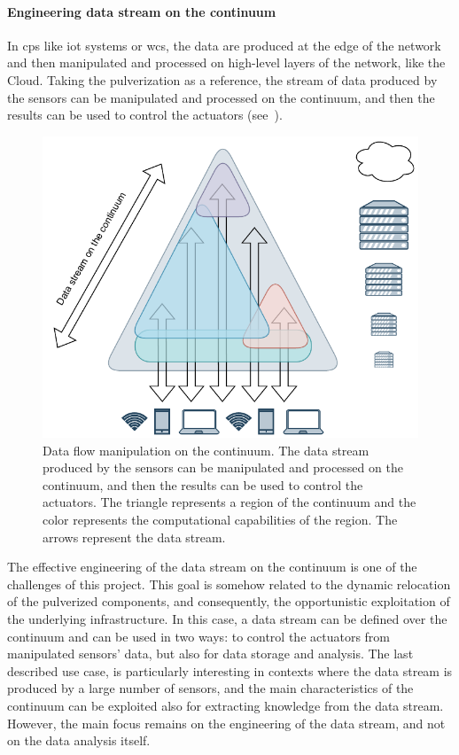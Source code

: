 \documentclass[12pt,a4paper]{article}
\begin{document}
\paragraph{Engineering data stream on the continuum}\label{sec:eng-data-stream}
In \ac{cps} like \ac{iot} systems or \ac{wcs},
the data are produced at the edge of the network and then manipulated and processed on high-level layers of the network, like the Cloud.
%
Taking the pulverization as a reference,
the stream of data produced by the sensors can be manipulated and processed on the continuum,
and then the results can be used to control the actuators (see~).
%
\begin{figure}[ht]
	\centering
	\includegraphics[width=.46\textwidth]{img/data-stream.drawio.pdf}
	\caption{
		Data flow manipulation on the continuum.
		The data stream produced by the sensors can be manipulated and processed on the continuum,
		and then the results can be used to control the actuators.
		The triangle represents a region of the continuum and the color represents the computational capabilities of the region.
		The arrows represent the data stream.
		}
	\label{fig:data-stream}
\end{figure}
%
The effective engineering of the data stream on the continuum is one of the challenges of this project.
%
This goal is somehow related to the dynamic relocation of the pulverized components,
and consequently,
the opportunistic exploitation of the underlying infrastructure.
%
In this case,
a data stream can be defined over the continuum and can be used in two ways:
to control the actuators from manipulated sensors' data,
but also for data storage and analysis.
%
The last described use case,
is particularly interesting in contexts where the data stream is produced by a large number of sensors,
and the main characteristics of the continuum can be exploited also for extracting knowledge from the data stream.
%
However,
the main focus remains on the engineering of the data stream,
and not on the data analysis itself.
\end{document}

